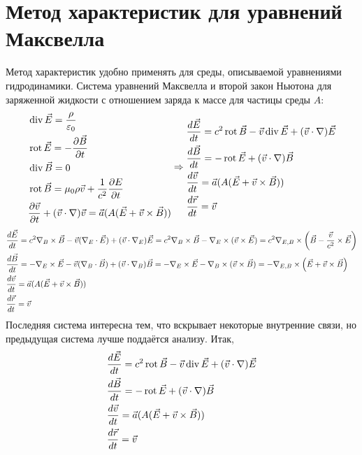 \section{Метод характеристик для уравнений Максвелла}

Метод характеристик удобно применять для среды, описываемой уравнениями гидродинамики. Система уравнений Максвелла и второй закон Ньютона для заряженной жидкости с отношением заряда к массе для частицы среды $A$:
\[
	\begin{aligned}
	& \,\mathrm{div}\, \vec{E} = \frac{\rho}{\varepsilon_0} \\
	& \,\mathrm{rot}\, \vec{E} = - \frac{\partial \vec{B}}{\partial t}\\
	& \,\mathrm{div}\, \vec{B} = 0 \\
	& \,\mathrm{rot}\, \vec{B} = \mu_0 \rho \vec{v} + \frac{1}{c^2} \frac{\partial E}{\partial t} \\
	& \frac{\partial \vec{v}}{\partial t} + (\vec{v}\cdot\nabla) \vec{v} = \vec{a}(A(\vec{E} + \vec{v}\times\vec{B}))
	\end{aligned}
	\Rightarrow
	\begin{aligned}
	& \frac{d \vec{E}}{d t} = c^2 \,\mathrm{rot}\, \vec{B} - \vec{v} \,\mathrm{div}\, \vec{E} + (\vec{v} \cdot \nabla) \vec{E} \\
	& \frac{d \vec{B}}{d t} = - \,\mathrm{rot}\, \vec{E} + (\vec{v} \cdot \nabla) \vec{B} \\
	& \frac{d \vec{v}}{d t} = \vec{a}(A(\vec{E} + \vec{v}\times\vec{B})) \\
	& \frac{d \vec{r}}{d t} = \vec{v}
	\end{aligned}
\] 
\[
	\begin{aligned}
	& \frac{d \vec{E}}{d t} = c^2 \nabla_B \times \vec{B} - \vec{v} (\nabla_E \cdot \vec{E}) + (\vec{v} \cdot \nabla_E) \vec{E} =
		c^2 \nabla_B \times \vec{B} - \nabla_E \times (\vec{v} \times \vec{E}) =
		c^2 \nabla_{E, B} \times \left(\vec{B} - \frac{\vec{v}}{c^2} \times \vec{E}\right) \\
	& \frac{d \vec{B}}{d t} = -  \nabla_E \times \vec{E} - \vec{v} (\nabla_B \cdot \vec{B}) + (\vec{v} \cdot \nabla_B) \vec{B} =
		- \nabla_E \times \vec{E} - \nabla_B \times (\vec{v} \times \vec{B}) =
		- \nabla_{E, B} \times \left(\vec{E} + \vec{v} \times \vec{B}\right) \\
	& \frac{d \vec{v}}{d t} = \vec{a}(A(\vec{E} + \vec{v}\times\vec{B})) \\
	& \frac{d \vec{r}}{d t} = \vec{v}
	\end{aligned}
\]
Последняя система интересна тем, что вскрывает некоторые внутренние связи, но предыдущая система лучше поддаётся анализу. Итак,
\[
	\begin{aligned}
	& \frac{d \vec{E}}{d t} = c^2 \,\mathrm{rot}\, \vec{B} - \vec{v} \,\mathrm{div}\, \vec{E} + (\vec{v} \cdot \nabla) \vec{E} \\
	& \frac{d \vec{B}}{d t} = - \,\mathrm{rot}\, \vec{E} + (\vec{v} \cdot \nabla) \vec{B} \\
	& \frac{d \vec{v}}{d t} = \vec{a}(A(\vec{E} + \vec{v}\times\vec{B})) \\
	& \frac{d \vec{r}}{d t} = \vec{v}
	\end{aligned}
\]
